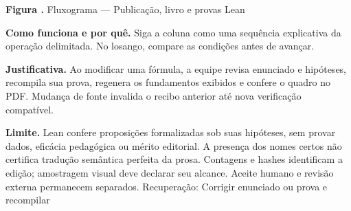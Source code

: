{\small\textbf{Figura \thefigure.} Fluxograma --- Publicação, livro e provas Lean}\par\smallskip
\noindent\textbf{Como funciona e por quê.} Siga a coluna como uma sequência explicativa da operação delimitada. No losango, compare as condições antes de avançar.\par
\noindent\textbf{Justificativa.} Ao modificar uma fórmula, a equipe revisa enunciado e hipóteses, recompila sua prova, regenera os fundamentos exibidos e confere o quadro no PDF. Mudança de fonte invalida o recibo anterior até nova verificação compatível.\par
\noindent\textbf{Limite.} Lean confere proposições formalizadas sob suas hipóteses, sem provar dados, eficácia pedagógica ou mérito editorial. A presença dos nomes certos não certifica tradução semântica perfeita da prosa. Contagens e hashes identificam a edição; amostragem visual deve declarar seu alcance. Aceite humano e revisão externa permanecem separados. Recuperação: Corrigir enunciado ou prova e recompilar\par\smallskip
{}
